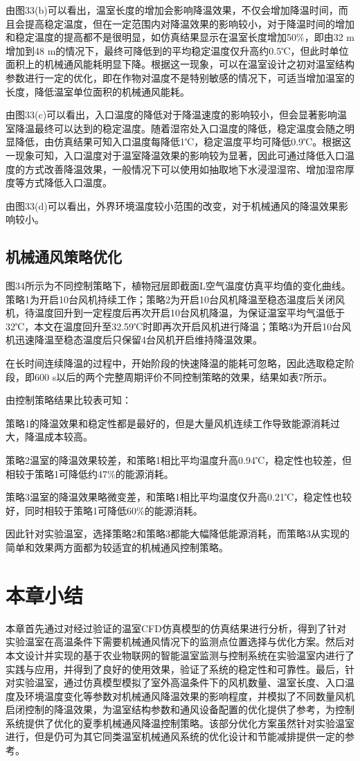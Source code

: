 由图33(b)可以看出，温室长度的增加会影响降温效果，不仅会增加降温时间，而且会提高稳定温度，但在一定范围内对降温效果的影响较小，对于降温时间的增加和稳定温度的提高都不是很明显，如仿真结果显示在温室长度增加50\%，即由32 m增加到48 m的情况下，最终可降低到的平均稳定温度仅升高约0.5℃，但此时单位面积上的机械通风能耗明显下降。根据这一现象，可以在温室设计之初对温室结构参数进行一定的优化，即在作物对温度不是特别敏感的情况下，可适当增加温室的长度，降低温室单位面积的机械通风能耗。

由图33(c)可以看出，入口温度的降低对于降温速度的影响较小，但会显著影响温室降温最终可以达到的稳定温度。随着湿帘处入口温度的降低，稳定温度会随之明显降低，由仿真结果可知入口温度每降低1℃，稳定温度平均可降低0.9℃。根据这一现象可知，入口温度对于温室降温效果的影响较为显著，因此可通过降低入口温度的方式改善降温效果，一般情况下可以使用如抽取地下水浸湿湿帘、增加湿帘厚度等方式降低入口温度。

由图33(d)可以看出，外界环境温度较小范围的改变，对于机械通风的降温效果影响较小。

	\subsection{机械通风策略优化}
	图34所示为不同控制策略下，植物冠层即截面L空气温度仿真平均值的变化曲线。策略1为开启10台风机持续工作；策略2为开启10台风机降温至稳态温度后关闭风机，待温度回升到一定程度后再次开启10台风机降温，为保证温室平均气温低于32℃，本文在温度回升至32.59℃时即再次开启风机进行降温；策略3为开启10台风机迅速降温至稳态温度后只保留4台风机开启维持降温效果。
	
	在长时间连续降温的过程中，开始阶段的快速降温的能耗可忽略，因此选取稳定阶段，即600 s以后的两个完整周期评价不同控制策略的效果，结果如表7所示。
	
	由控制策略结果比较表可知：
	
策略1的降温效果和稳定性都是最好的，但是大量风机连续工作导致能源消耗过大，降温成本较高。

策略2温室的降温效果较差，和策略1相比平均温度升高0.94℃，稳定性也较差，但相较于策略1可降低约47\%的能源消耗。

策略3温室的降温效果略微变差，和策略1相比平均温度仅升高0.21℃，稳定性也较好，同时相较于策略1可降低60\%的能源消耗。

因此针对实验温室，选择策略2和策略3都能大幅降低能源消耗，而策略3从实现的简单和效果两方面都为较适宜的机械通风控制策略。

\section{本章小结}
本章首先通过对经过验证的温室CFD仿真模型的仿真结果进行分析，得到了针对实验温室在高温条件下需要机械通风情况下的监测点位置选择与优化方案。然后对本文设计并实现的基于农业物联网的智能温室监测与控制系统在实验温室内进行了实践与应用，并得到了良好的使用效果，验证了系统的稳定性和可靠性。最后，针对实验温室，通过仿真模型模拟了室外高温条件下的风机数量、温室长度、入口温度及环境温度变化等参数对机械通风降温效果的影响程度，并模拟了不同数量风机启闭控制的降温效果，为温室结构参数和通风设备配置的优化提供了参考，为控制系统提供了优化的夏季机械通风降温控制策略。该部分优化方案虽然针对实验温室进行，但是仍可为其它同类温室机械通风系统的优化设计和节能减排提供一定的参考。
